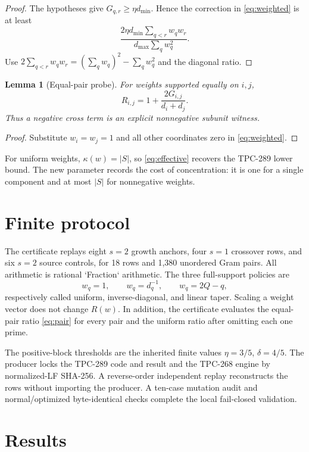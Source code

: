 \documentclass[10pt]{article}
\newtheorem{lemma}{Lemma}
\begin{document}
\begin{proof}
The hypotheses give $G_{q,r}\ge\eta d_{\min}$.  Hence the correction in
\eqref{eq:weighted} is at least
\[
 \frac{2\eta d_{\min}\sum_{q<r}w_qw_r}
 {d_{\max}\sum_qw_q^2}.
\]
Use $2\sum_{q<r}w_qw_r=(\sum_qw_q)^2-\sum_qw_q^2$ and the diagonal ratio.
\end{proof}

\begin{lemma}[Equal-pair probe]
For weights supported equally on $i,j$,
\begin{equation}
 R_{i,j}=1+\frac{2G_{i,j}}{d_i+d_j}.
 \label{eq:pair}
\end{equation}
Thus a negative cross term is an explicit nonnegative subunit witness.
\end{lemma}

\begin{proof}
Substitute $w_i=w_j=1$ and all other coordinates zero in
\eqref{eq:weighted}.\end{proof}

For uniform weights, $\kappa(w)=|S|$, so \eqref{eq:effective} recovers the
TPC-289 lower bound.  The new parameter records the cost of concentration:
it is one for a single component and at most $|S|$ for nonnegative weights.

\section{Finite protocol}

The certificate replays eight $s=2$ growth anchors, four $s=1$ crossover
rows, and six $s=2$ source controls, for 18 rows and 1,380 unordered Gram
pairs.  All arithmetic is rational `Fraction` arithmetic.  The three
full-support policies are
\[
 w_q=1,\qquad w_q=d_q^{-1},\qquad w_q=2Q-q,
\]
respectively called uniform, inverse-diagonal, and linear taper.  Scaling a
weight vector does not change $R(w)$.  In addition, the certificate evaluates
the equal-pair ratio \eqref{eq:pair} for every pair and the uniform ratio after
omitting each one prime.

The positive-block thresholds are the inherited finite values
$\eta=3/5$, $\delta=4/5$.  The producer locks the TPC-289 code and result and
the TPC-268 engine by normalized-LF SHA-256.  A reverse-order independent
replay reconstructs the rows without importing the producer.  A ten-case
mutation audit and normal/optimized byte-identical checks complete the local
fail-closed validation.

\section{Results}
\end{document}

